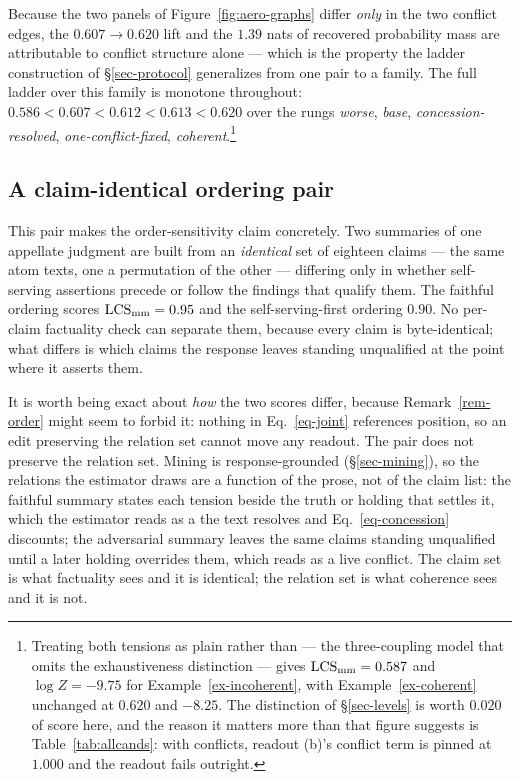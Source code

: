 Because the two panels of Figure~\ref{fig:aero-graphs} differ \emph{only} in the two conflict edges,
the $0.607\to0.620$ lift and the $1.39$ nats of recovered probability mass are attributable to conflict
structure alone --- which is the property the ladder construction of \S\ref{sec-protocol} generalizes
from one pair to a family. The full ladder over this family is monotone throughout:
$0.586 < 0.607 < 0.612 < 0.613 < 0.620$ over the rungs \emph{worse}, \emph{base},
\emph{concession-resolved}, \emph{one-conflict-fixed}, \emph{coherent}.\footnote{Treating both tensions
as plain \con{} rather than \exc{} --- the three-coupling model that omits the exhaustiveness
distinction --- gives $\mathrm{LCS}_{\mathrm{mm}}=0.587$ and $\log Z=-9.75$ for Example~\ref{ex-incoherent}, with
Example~\ref{ex-coherent} unchanged at $0.620$ and $-8.25$. The distinction of \S\ref{sec-levels} is
worth $0.020$ of score here, and the reason it matters more than that figure suggests is
Table~\ref{tab:allcands}: with \exc{} conflicts, readout (b)'s conflict term is pinned at $1.000$ and
the readout fails outright.}

\subsection{A claim-identical ordering pair}
\label{sec-example-order}

This pair makes the order-sensitivity claim concretely. Two summaries of one appellate
judgment are built from an \emph{identical} set of eighteen claims --- the same atom texts, one a
permutation of the other --- differing only in whether self-serving assertions precede or follow the
findings that qualify them. The faithful ordering scores $\mathrm{LCS}_{\mathrm{mm}}=0.95$ and the
self-serving-first ordering $0.90$. No per-claim factuality check can separate them, because every
claim is byte-identical; what differs is which claims the response leaves standing unqualified at the
point where it asserts them.

It is worth being exact about \emph{how} the two scores differ, because Remark~\ref{rem-order} might
seem to forbid it: nothing in Eq.~\ref{eq-joint} references position, so an edit preserving the
relation set cannot move any readout. The pair does not preserve the relation set. Mining is
response-grounded (\S\ref{sec-mining}), so the relations the estimator draws are a function of the
prose, not of the claim list: the faithful summary states each tension beside the truth or holding
that settles it, which the estimator reads as a  the text resolves and
Eq.~\ref{eq-concession} discounts; the adversarial summary leaves the same claims standing
unqualified until a later holding overrides them, which reads as a live conflict. The claim set is
what factuality sees and it is identical; the relation set is what coherence sees and it is not.



